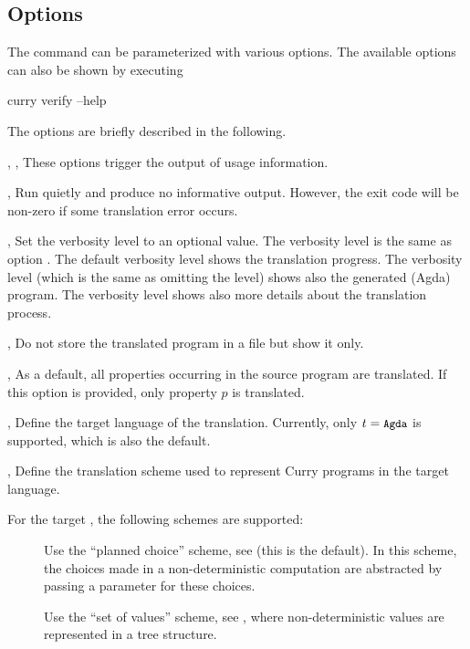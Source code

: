 \subsection{Options}

The command  can be parameterized
with various options.
The available options can also be shown by executing
\begin{curry}
curry verify --help
\end{curry}
The options are briefly described in the following.

\begin{description}
\item{, , }
These options trigger the output of usage information.

\item{, }
Run quietly and produce no informative output.
However, the exit code will be non-zero if some translation error occurs.

\item{, }
Set the verbosity level to an optional value.
The verbosity level  is the same as option .
The default verbosity level  shows the translation progress.
The verbosity level  (which is the same as omitting the level)
shows also the generated (Agda) program.
The verbosity level  shows also more details about
the translation process.

\item{, }
Do not store the translated program in a file but show it only.

\item{, }
As a default, all properties occurring in the source program are
translated. If this option is provided, only property $p$ is translated.

\item{, }
Define the target language of the translation.
Currently, only $t = \code{Agda}$ is supported, which is also the
default.

\item{, }
Define the translation scheme used to represent Curry programs
in the target language.

For the target , the following schemes are supported:
\begin{description}
\item[]
Use the ``planned choice'' scheme, see \cite{AntoyHanusLibby17EPTCS}
(this is the default).
In this scheme, the choices made in a non-deterministic computation
are abstracted by passing a parameter for these choices.
\item[]
Use the ``set of values'' scheme, see \cite{AntoyHanusLibby17EPTCS},
where non-deterministic values are represented in a tree structure.
\end{description}

\end{description}


